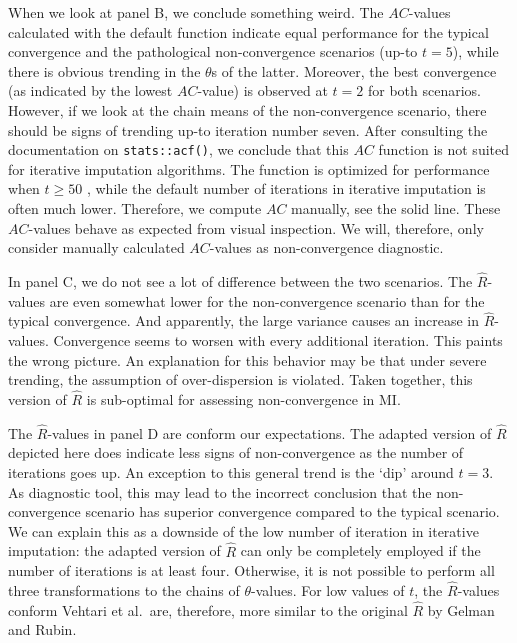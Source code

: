 \documentclass[Royal,times,sageh]{sagej}
\begin{document}
When we look at panel B, we conclude something weird. The \(AC\)-values calculated with the default function indicate equal performance for the typical convergence and the pathological non-convergence scenarios (up-to \(t=5\)), while there is obvious trending in the \(\theta\)s of the latter. Moreover, the best convergence (as indicated by the lowest \(AC\)-value) is observed at \(t=2\) for both scenarios. However, if we look at the chain means of the non-convergence scenario, there should be signs of trending up-to iteration number seven. After consulting the documentation on \texttt{stats::acf()}, we conclude that this \(AC\) function is not suited for iterative imputation algorithms. The function is optimized for performance when \(t\geq50\) \citep{box15}, while the default number of iterations in iterative imputation is often much lower. Therefore, we compute \(AC\) manually, see the solid line. These \(AC\)-values behave as expected from visual inspection. We will, therefore, only consider manually calculated \(AC\)-values as non-convergence diagnostic.

In panel C, we do not see a lot of difference between the two scenarios. The \(\widehat{R}\)-values are even somewhat lower for the non-convergence scenario than for the typical convergence. And apparently, the large variance causes an increase in \(\widehat{R}\)-values. Convergence seems to worsen with every additional iteration. This paints the wrong picture. An explanation for this behavior may be that under severe trending, the assumption of over-dispersion is violated. Taken together, this version of \(\widehat{R}\) is sub-optimal for assessing non-convergence in MI.

The \(\widehat{R}\)-values in panel D are conform our expectations. The adapted version of \(\widehat{R}\) depicted here does indicate less signs of non-convergence as the number of iterations goes up. An exception to this general trend is the `dip' around \(t=3\). As diagnostic tool, this may lead to the incorrect conclusion that the non-convergence scenario has superior convergence compared to the typical scenario. We can explain this as a downside of the low number of iteration in iterative imputation: the adapted version of \(\widehat{R}\) can only be completely employed if the number of iterations is at least four. Otherwise, it is not possible to perform all three transformations to the chains of \(\theta\)-values. For low values of \(t\), the \(\widehat{R}\)-values conform Vehtari et al.~are, therefore, more similar to the original \(\widehat{R}\) by Gelman and Rubin. \newline
\end{document}

